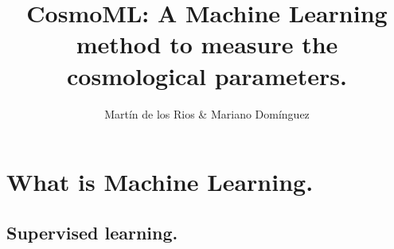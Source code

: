 \documentclass{beamer}
\begin{document}
\title{CosmoML: A Machine Learning method to measure the cosmological parameters.} 
\author{Mart\'in de los Rios \& Mariano Dom\'inguez} 

\frame{\titlepage
\date{}} 


\section{What is Machine Learning.}
\frame{
\tableofcontents[ 
    currentsection, 
    sectionstyle=show/hide, 
    sectionstyle=show/shaded, 
    ] 
}

\subsection{Supervised learning.}
\end{document}
